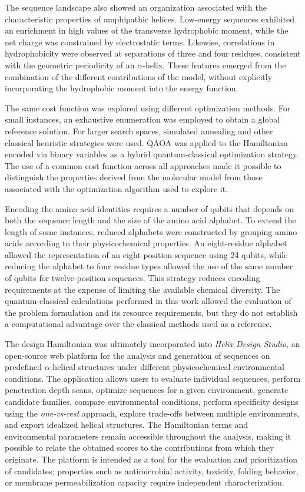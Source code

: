 The sequence landscape also showed an organization associated with the characteristic properties of amphipathic helices. Low-energy sequences exhibited an enrichment in high values of the transverse hydrophobic moment, while the net charge was constrained by electrostatic terms. Likewise, correlations in hydrophobicity were observed at separations of three and four residues, consistent with the geometric periodicity of an $\alpha$-helix. These features emerged from the combination of the different contributions of the model, without explicitly incorporating the hydrophobic moment into the energy function.

The same cost function was explored using different optimization methods. For small instances, an exhaustive enumeration was employed to obtain a global reference solution. For larger search spaces, simulated annealing and other classical heuristic strategies were used. QAOA was applied to the Hamiltonian encoded via binary variables as a hybrid quantum-classical optimization strategy. The use of a common cost function across all approaches made it possible to distinguish the properties derived from the molecular model from those associated with the optimization algorithm used to explore it.

Encoding the amino acid identities requires a number of qubits that depends on both the sequence length and the size of the amino acid alphabet. To extend the length of some instances, reduced alphabets were constructed by grouping amino acids according to their physicochemical properties. An eight-residue alphabet allowed the representation of an eight-position sequence using 24 qubits, while reducing the alphabet to four residue types allowed the use of the same number of qubits for twelve-position sequences. This strategy reduces encoding requirements at the expense of limiting the available chemical diversity. The quantum-classical calculations performed in this work allowed the evaluation of the problem formulation and its resource requirements, but they do not establish a computational advantage over the classical methods used as a reference.

The design Hamiltonian was ultimately incorporated into \textit{Helix Design Studio}, an open-source web platform for the analysis and generation of sequences on predefined $\alpha$-helical structures under different physicochemical environmental conditions. The application allows users to evaluate individual sequences, perform penetration depth scans, optimize sequences for a given environment, generate candidate families, compare environmental conditions, perform specificity designs using the \textit{one-vs-rest} approach, explore trade-offs between multiple environments, and export idealized helical structures. The Hamiltonian terms and environmental parameters remain accessible throughout the analysis, making it possible to relate the obtained scores to the contributions from which they originate. The platform is intended as a tool for the evaluation and prioritization of candidates; properties such as antimicrobial activity, toxicity, folding behavior, or membrane permeabilization capacity require independent characterization.

